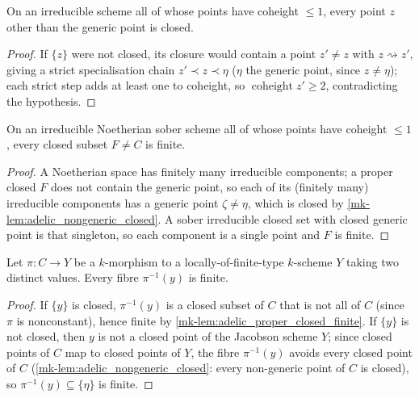 \begin{lemma}
  \label{mk-lem:adelic_nongeneric_closed}
  \leanok
  On an irreducible scheme all of whose points have coheight \(\le 1\),
  every point \(z\) other than the generic point is closed.
\end{lemma}
\begin{proof}
  \leanok
  If \(\{z\}\) were not closed, its closure would contain a point
  \(z' \ne z\) with \(z \rightsquigarrow z'\), giving a strict
  specialisation chain \(z' \prec z \prec \eta\) (\(\eta\) the generic
  point, since \(z \ne \eta\)); each strict step adds at least one to
  coheight, so \(\operatorname{coheight} z' \ge 2\), contradicting the
  hypothesis.
\end{proof}

\begin{lemma}
  \label{mk-lem:adelic_proper_closed_finite}
  \leanok
  On an irreducible Noetherian sober scheme all of whose points have
  coheight \(\le 1\), every closed subset \(F \ne C\) is finite.
\end{lemma}
\begin{proof}
  \leanok
  A Noetherian space has finitely many irreducible components; a proper
  closed \(F\) does not contain the generic point, so each of its
  (finitely many) irreducible components has a generic point \(\zeta
  \ne \eta\), which is closed by \ref{mk-lem:adelic_nongeneric_closed}.
  A sober irreducible closed set with closed generic point is that
  singleton, so each component is a single point and \(F\) is finite.
\end{proof}

\begin{lemma}
  \label{mk-lem:adelic_nonconstant_finite_fibres}
  \leanok
  Let \(\pi \colon C \to Y\) be a \(k\)-morphism to a
  locally-of-finite-type \(k\)-scheme \(Y\) taking two distinct values.
  Every fibre \(\pi^{-1}(y)\) is finite.
\end{lemma}
\begin{proof}
  \leanok
  If \(\{y\}\) is closed, \(\pi^{-1}(y)\) is a closed subset of \(C\)
  that is not all of \(C\) (since \(\pi\) is nonconstant), hence finite
  by \ref{mk-lem:adelic_proper_closed_finite}. If \(\{y\}\) is not closed,
  then \(y\) is not a closed point of the Jacobson scheme \(Y\); since
  closed points of \(C\) map to closed points of \(Y\), the fibre
  \(\pi^{-1}(y)\) avoids every closed point of \(C\)
  (\ref{mk-lem:adelic_nongeneric_closed}: every non-generic point of
  \(C\) is closed), so \(\pi^{-1}(y) \subseteq \{\eta\}\) is finite.
\end{proof}

